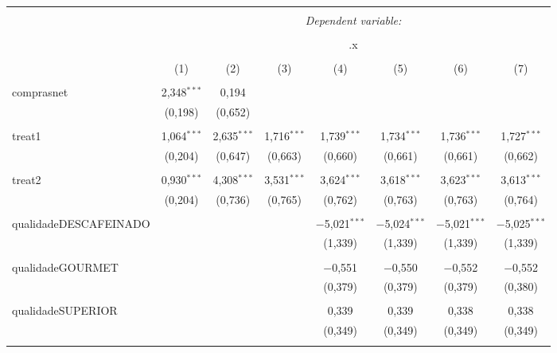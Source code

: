 
\begin{table}[!htbp] \centering 
  \caption{} 
  \label{} 
\begin{tabular}{@{\extracolsep{5pt}}lccccccc} 
\\[-1.8ex]\hline 
\hline \\[-1.8ex] 
 & \multicolumn{7}{c}{\textit{Dependent variable:}} \\ 
\cline{2-8} 
\\[-1.8ex] & \multicolumn{7}{c}{.x} \\ 
\\[-1.8ex] & (1) & (2) & (3) & (4) & (5) & (6) & (7)\\ 
\hline \\[-1.8ex] 
 comprasnet & 2,348$^{***}$ & 0,194 &  &  &  &  &  \\ 
  & (0,198) & (0,652) &  &  &  &  &  \\ 
  & & & & & & & \\ 
 treat1 & 1,064$^{***}$ & 2,635$^{***}$ & 1,716$^{***}$ & 1,739$^{***}$ & 1,734$^{***}$ & 1,736$^{***}$ & 1,727$^{***}$ \\ 
  & (0,204) & (0,647) & (0,663) & (0,660) & (0,661) & (0,661) & (0,662) \\ 
  & & & & & & & \\ 
 treat2 & 0,930$^{***}$ & 4,308$^{***}$ & 3,531$^{***}$ & 3,624$^{***}$ & 3,618$^{***}$ & 3,623$^{***}$ & 3,613$^{***}$ \\ 
  & (0,204) & (0,736) & (0,765) & (0,762) & (0,763) & (0,763) & (0,764) \\ 
  & & & & & & & \\ 
 qualidadeDESCAFEINADO &  &  &  & $-$5,021$^{***}$ & $-$5,024$^{***}$ & $-$5,021$^{***}$ & $-$5,025$^{***}$ \\ 
  &  &  &  & (1,339) & (1,339) & (1,339) & (1,339) \\ 
  & & & & & & & \\ 
 qualidadeGOURMET &  &  &  & $-$0,551 & $-$0,550 & $-$0,552 & $-$0,552 \\ 
  &  &  &  & (0,379) & (0,379) & (0,379) & (0,380) \\ 
  & & & & & & & \\ 
 qualidadeSUPERIOR &  &  &  & 0,339 & 0,339 & 0,338 & 0,338 \\ 
  &  &  &  & (0,349) & (0,349) & (0,349) & (0,349) \\ 
  & & & & & & & \\ 

\end{tabular}
\end{table}
